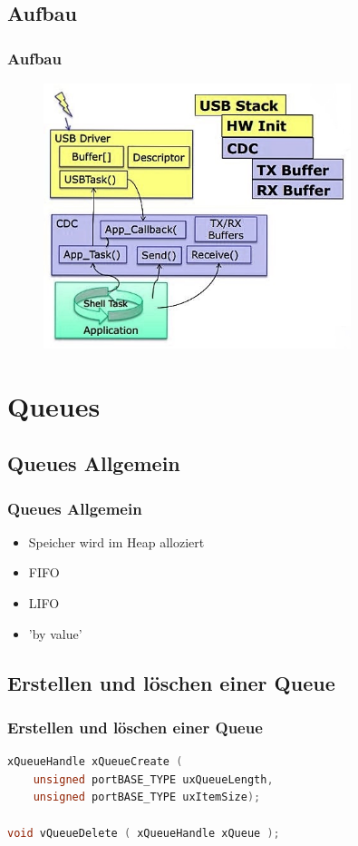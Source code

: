 \documentclass{beamer}
\begin{document}
	\subsection{Aufbau}
	\begin{frame}
		\frametitle{Aufbau}
		\begin{figure}
			\includegraphics[width=0.8\textwidth]{stack}
		\end{figure}		
	\end{frame}


	
	\section{Queues}
	\subsection{Queues Allgemein}
	\begin{frame}
		\frametitle{Queues Allgemein}
		\begin{itemize}
			\item	Speicher wird im Heap alloziert
			\item	FIFO
			\item	LIFO
			\item	'by value'
		\end{itemize}
	\end{frame}

	\subsection{Erstellen und löschen einer Queue}
\begin{frame}[fragile]
\frametitle{Erstellen und löschen einer Queue}
\begin{lstlisting}[language = C]
xQueueHandle xQueueCreate ( 
	unsigned portBASE_TYPE uxQueueLength,
	unsigned portBASE_TYPE uxItemSize);

void vQueueDelete ( xQueueHandle xQueue );	
\end{lstlisting}
\end{frame}
	
\end{document}
